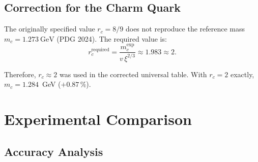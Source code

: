 	\begin{table}[H]
		\centering
		\caption{Yukawa predictions with corrected $r_i,p_i$ and comparison with the PDG 2024 masses.}
		\label{tab:quark_yukawa_predictions}
	\end{table}
	
	\subsection{Correction for the Charm Quark}
	\label{subsec:charm_correction}
	
	The originally specified value $r_c=8/9$ does not reproduce the reference mass $m_c=1.273\ \mathrm{GeV}$ (PDG 2024). The required value is:
	\[
	r_c^{\text{required}}=\frac{m_c^{\text{exp}}}{v\,\xi^{2/3}}\approx 1.983 \approx 2.
	\]
	
	Therefore, $r_c \approx 2$ was used in the corrected universal table. With $r_c = 2$ exactly, $m_c = 1.284$~GeV ($+0.87\,\%$).

		
	\section{Experimental Comparison}
	\label{sec:comprehensive_validation}
	
	\subsection{Accuracy Analysis}
	\label{subsec:complete_accuracy}
	
